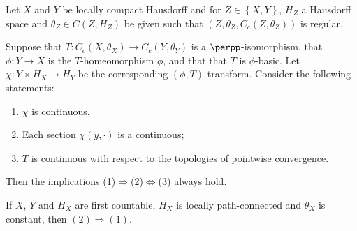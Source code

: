 %
%

\begin{theorem}\label{theorembasicisomorphisms}
Let $X$ and $Y$ be locally compact Hausdorff and for $Z\in\left\{X,Y\right\}$, $H_Z$ a Hausdorff space and $\theta_Z\in C(Z,H_Z)$ be given such that $(Z,\theta_Z,C_c(Z,\theta_Z))$ is regular.

Suppose that $T:C_c(X,\theta_X)\to C_c(Y,\theta_Y)$ is a $\perpp$-isomorphism, that $\phi:Y\to X$ is the $T$-homeomorphism $\phi$, and that that $T$ is $\phi$-basic. Let $\chi:Y\times H_X\to H_Y$ be the corresponding $(\phi,T)$-transform. Consider the following statements:
\begin{enumerate}
\item[(1)] $\chi$ is continuous.
\item[(2)] Each section $\chi(y,\cdot)$ is a continuous;
\item[(3)] $T$ is continuous with respect to the topologies of pointwise convergence.
\end{enumerate}
Then the implications (1)$\Longrightarrow$(2)$\iff$(3) always hold.

If $X$, $Y$ and $H_X$ are first countable, $H_X$ is locally path-connected and $\theta_X$ is constant, then $(2)\Longrightarrow (1)$.
\end{theorem}

